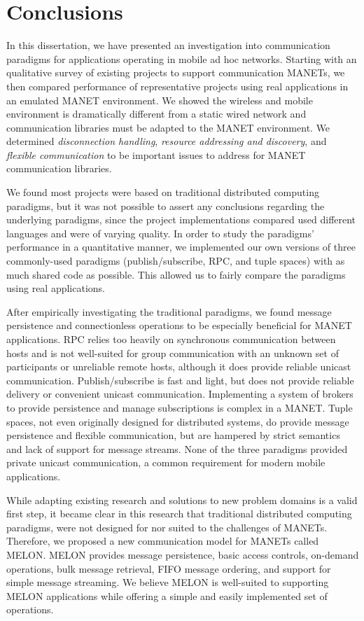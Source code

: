 \chapter{Conclusions}\label{chapter:conclusions}

In this dissertation, we have presented an investigation into communication paradigms for applications operating in mobile ad hoc networks. Starting with an qualitative survey of existing projects to support communication MANETs, we then compared performance of representative projects using real applications in an emulated MANET environment. We showed the wireless and mobile environment is dramatically different from a static wired network and communication libraries must be adapted to the MANET environment. We determined \textit{disconnection handling}, \textit{resource addressing and discovery}, and \textit{flexible communication} to be important issues to address for MANET communication libraries.

We found most projects were based on traditional distributed computing paradigms, but it was not possible to assert any conclusions regarding the underlying paradigms, since the project implementations compared used different languages and were of varying quality. In order to study the paradigms' performance in a quantitative manner, we implemented our own versions of three commonly-used paradigms (publish/subscribe, RPC, and tuple spaces) with as much shared code as possible. This allowed us to fairly compare the paradigms using real applications.

After empirically investigating the traditional paradigms, we found message persistence and connectionless operations to be especially beneficial for MANET applications. RPC relies too heavily on synchronous communication between hosts and is not well-suited for group communication with an unknown set of participants or unreliable remote hosts, although it does provide reliable unicast communication. Publish/subscribe is fast and light, but does not provide reliable delivery or convenient unicast communication. Implementing a system of brokers to provide persistence and manage subscriptions is complex in a MANET. Tuple spaces, not even originally designed for distributed systems, do provide message persistence and flexible communication, but are hampered by strict semantics and lack of support for message streams. None of the three paradigms provided private unicast communication, a common requirement for modern mobile applications.

While adapting existing research and solutions to new problem domains is a valid first step, it became clear in this research that traditional distributed computing paradigms, were not designed for nor suited to the challenges of MANETs. Therefore, we proposed a new communication model for MANETs called MELON. MELON provides message persistence, basic access controls, on-demand operations, bulk message retrieval, FIFO message ordering, and support for simple message streaming. We believe MELON is well-suited to supporting MELON applications while offering a simple and easily implemented set of operations. 

